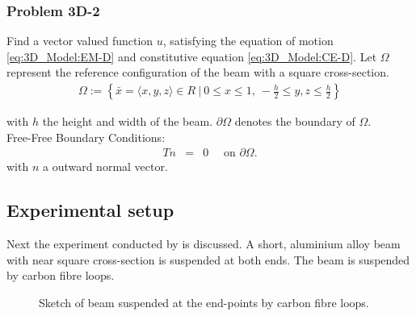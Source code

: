 \documentclass[../../main.tex]{subfiles}
\begin{document}
\subsubsection{Problem 3D-2}
Find a vector valued function $u$, satisfying the equation of motion \eqref{eq:3D_Model:EM-D} and constitutive equation \eqref{eq:3D_Model:CE-D}. Let $\Omega$ represent the reference configuration of the beam with a square cross-section.
\begin{eqnarray*}
	\Omega := \left\{ \bar{x} = \langle x,y,z \rangle \in R \ | \ 0 \leq x \leq 1, \ -\frac{h}{2} \leq y, z \leq \frac{h}{2}  \right\}
\end{eqnarray*}

with $h$ the height and width of the beam. $\partial \Omega$ denotes the boundary of $\Omega$. \label{sym:height} \\

{Free-Free Boundary Conditions:}\\
\begin{eqnarray*}
	Tn & = & 0 \quad \textrm{ on } \partial\Omega.
\end{eqnarray*} with $n$ a outward normal vector.




\subsection{Experimental setup}
Next the experiment conducted by \cite{SP06} is discussed. A short, aluminium alloy beam with near square cross-section is suspended at both ends. The beam is suspended by carbon fibre loops.

\begin{figure}[h!]
	\centering
	\caption{Sketch of beam suspended at the end-points by carbon fibre loops.}
\end{figure} 
\FloatBarrier
\end{document}
